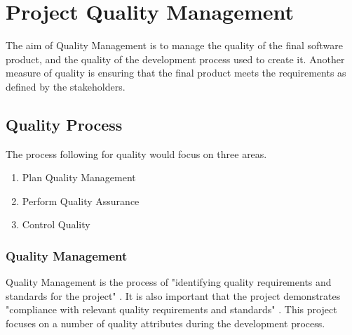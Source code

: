 \chapter{Project Quality Management}

The aim of Quality Management is to manage the quality of the final software product, and the quality of the development process used to create it. Another measure of quality is ensuring that the final product meets the requirements as defined by the stakeholders. 

\section{Quality Process}

The process following for quality would focus on three areas.

\begin{enumerate}
\item Plan Quality Management
\item Perform Quality Assurance
\item Control Quality
\end{enumerate}

\subsection{Quality Management}

Quality Management is the process of "identifying quality requirements and standards for the project" \parencite{pmbok}. It is also important that the project demonstrates "compliance with relevant quality requirements and standards" \parencite{pmbok}. This project focuses on a number of quality attributes during the development process.\newpage


